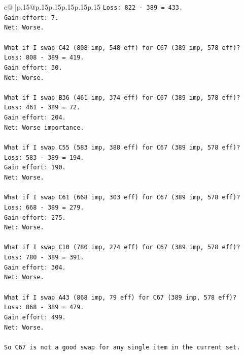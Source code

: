 \documentclass{article}
\begin{document}
{\begin{supertabular}{c@{$\;$}|p{.15\linewidth}@{}p{.15\linewidth}p{.15\linewidth}p{.15\linewidth}p{.15\linewidth}p{.15\linewidth}}
{{{\texttt{Loss: 822 {-} 389 = 433.} \\
\texttt{Gain effort: 7.} \\
\texttt{Net: Worse.} \\
\\ 
\texttt{What if I swap C42 (808 imp, 548 eff) for C67 (389 imp, 578 eff)?} \\
\texttt{Loss: 808 {-} 389 = 419.} \\
\texttt{Gain effort: 30.} \\
\texttt{Net: Worse.} \\
\\ 
\texttt{What if I swap B36 (461 imp, 374 eff) for C67 (389 imp, 578 eff)?} \\
\texttt{Loss: 461 {-} 389 = 72.} \\
\texttt{Gain effort: 204.} \\
\texttt{Net: Worse importance.} \\
\\ 
\texttt{What if I swap C55 (583 imp, 388 eff) for C67 (389 imp, 578 eff)?} \\
\texttt{Loss: 583 {-} 389 = 194.} \\
\texttt{Gain effort: 190.} \\
\texttt{Net: Worse.} \\
\\ 
\texttt{What if I swap C61 (668 imp, 303 eff) for C67 (389 imp, 578 eff)?} \\
\texttt{Loss: 668 {-} 389 = 279.} \\
\texttt{Gain effort: 275.} \\
\texttt{Net: Worse.} \\
\\ 
\texttt{What if I swap C10 (780 imp, 274 eff) for C67 (389 imp, 578 eff)?} \\
\texttt{Loss: 780 {-} 389 = 391.} \\
\texttt{Gain effort: 304.} \\
\texttt{Net: Worse.} \\
\\ 
\texttt{What if I swap A43 (868 imp, 79 eff) for C67 (389 imp, 578 eff)?} \\
\texttt{Loss: 868 {-} 389 = 479.} \\
\texttt{Gain effort: 499.} \\
\texttt{Net: Worse.} \\
\\ 
\texttt{So C67 is not a good swap for any single item in the current set.} \\
}}}
\end{supertabular}}
\end{document}
